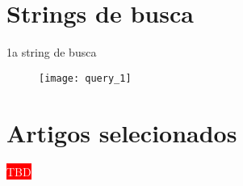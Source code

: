 \chapter{Strings de busca}

1a string de busca

\begin{figure}[h]
\texttt{[image: query\_1]}
\centering
\end{figure}


\chapter{Artigos selecionados}

\textcolor{white}{\colorbox{red}{TBD}}